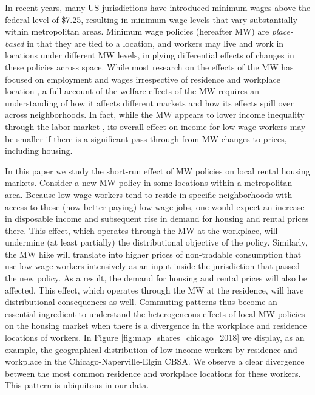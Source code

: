 

In recent years, many US jurisdictions have introduced minimum wages above the 
federal level of \$7.25, resulting in minimum wage levels that vary 
substantially within metropolitan areas.
Minimum wage policies (hereafter MW) are \textit{place-based} in that they are 
tied to a location, and workers may live and work in locations under different 
MW levels, 
implying differential effects of changes in these policies across space.
While most research on the effects of the MW has focused on employment and 
wages irrespective of residence and workplace location
\parencite[e.g.,][]{CardKrueger1994, CegnizEtAl2019},
a full account of the welfare effects of the MW requires an understanding of 
how it affects different markets and how its effects spill over across 
neighborhoods.
In fact, while the MW appears to lower income inequality through the labor 
market \parencite{Lee1999, AutorEtAl2016},
its overall effect on income for low-wage workers may be smaller if there is 
a significant pass-through from MW changes to prices, including housing.

In this paper we study the short-run effect of MW policies on local rental 
housing markets.
Consider a new MW policy in some locations within a metropolitan area.
Because low-wage workers tend to reside in specific neighborhoods with access 
to those (now better-paying) low-wage jobs,
one would expect an increase in disposable income and subsequent rise in demand 
for housing and rental prices there.
This effect, which operates through the MW at the workplace, 
will undermine (at least partially) the distributional objective of the policy.
Similarly, the MW hike will translate into higher prices of non-tradable 
consumption that use low-wage workers intensively as an input inside the 
jurisdiction that passed the new policy.
As a result, the demand for housing and rental prices will also be affected.
This effect, which operates through the MW at the residence, will have 
distributional consequences as well.
Commuting patterns thus become an essential ingredient to understand the 
heterogeneous effects of local MW policies on the housing market when there 
is a divergence in the workplace and residence locations of workers.
In Figure \ref{fig:map_shares_chicago_2018} we display, as an example, the 
geographical distribution of low-income workers by residence and workplace in 
the Chicago-Naperville-Elgin CBSA.
We observe a clear divergence between the most common residence and workplace 
locations for these workers.
This pattern is ubiquitous in our data. 

